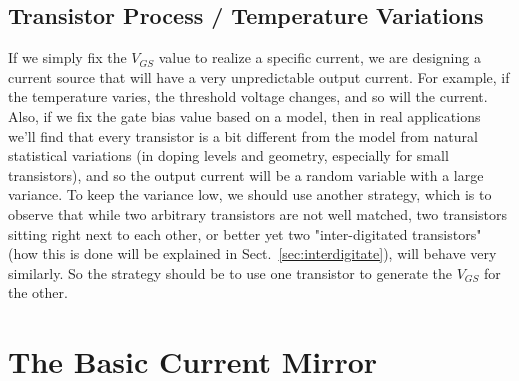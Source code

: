 \subsection{Transistor Process / Temperature Variations}
If we simply fix the $V_{GS}$ value to realize a specific current, we are designing a current source that will have a very unpredictable output current.  For example, if the temperature varies, the threshold voltage changes, and so will the current.  Also, if we fix the gate bias value based on a model, then in real applications we'll find that every transistor is a bit different from the model from natural statistical variations (in doping levels and geometry, especially for small transistors), and so the output current will be a random variable with a large variance.  To keep the variance low, we should use another strategy, which is to observe that while two arbitrary transistors are not well matched, two transistors sitting right next to each other, or better yet two "inter-digitated transistors" (how this is done will be explained in Sect.~\ref{sec:interdigitate}), will behave very similarly. So the strategy should be to use one transistor to generate the $V_{GS}$ for the other.
\section{The Basic Current Mirror}
